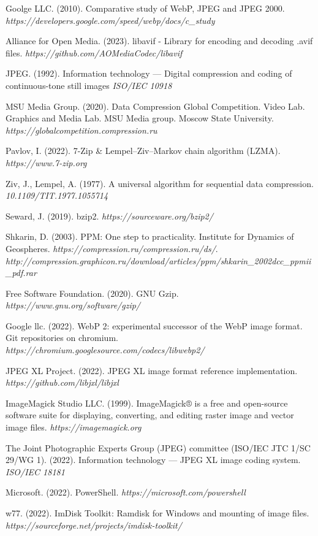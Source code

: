 \documentclass[11pt,a4paper]{report}
\begin{document}
\begin{thebibliography}{9}
Goolge LLC. (2010). Comparative study of WebP, JPEG and JPEG 2000.
\textit{https://developers.google.com/speed/webp/docs/c\_study}

Alliance for Open Media. (2023). libavif - Library for encoding and decoding .avif files. \textit{https://github.com/AOMediaCodec/libavif}

JPEG. (1992). Information technology — Digital compression and coding of continuous-tone still images \textit{ISO/IEC 10918}

MSU Media Group. (2020). Data Compression Global Competition. Video Lab. Graphics and Media Lab. MSU Media group. Moscow State University. \textit{https://globalcompetition.compression.ru}

Pavlov, I. (2022). 7-Zip \& Lempel–Ziv–Markov chain algorithm (LZMA). \textit{https://www.7-zip.org}

Ziv, J., Lempel, A. (1977). A universal algorithm for sequential data compression. \textit{10.1109/TIT.1977.1055714}

Seward, J. (2019). bzip2. \textit{https://sourceware.org/bzip2/}

Shkarin, D. (2003). PPM: One step to practicality. Institute for Dynamics of Geospheres. \textit{https://compression.ru/compression.ru/ds/}. \textit{http://compression.graphicon.ru/download/articles/ppm/shkarin\_2002dcc\_ppmii\_pdf.rar}

Free Software Foundation. (2020). GNU Gzip. \textit{https://www.gnu.org/software/gzip/}

Google llc. (2022). WebP 2: experimental successor of the WebP image format. Git repositories on chromium. \textit{https://chromium.googlesource.com/codecs/libwebp2/}

JPEG XL Project. (2022). JPEG XL image format reference implementation. \textit{https://github.com/libjxl/libjxl}

ImageMagick Studio LLC. (1999). ImageMagick® is a free and open-source software suite for displaying, converting, and editing raster image and vector image files. \textit{https://imagemagick.org}

The Joint Photographic Experts Group (JPEG) committee (ISO/IEC JTC 1/SC 29/WG 1). (2022). Information technology — JPEG XL image coding system. \textit{ISO/IEC 18181}

Microsoft. (2022). PowerShell. \textit{https://microsoft.com/powershell}

w77. (2022). ImDisk Toolkit: Ramdisk for Windows and mounting of image files. \textit{https://sourceforge.net/projects/imdisk-toolkit/}

\end{thebibliography}
\end{document}
